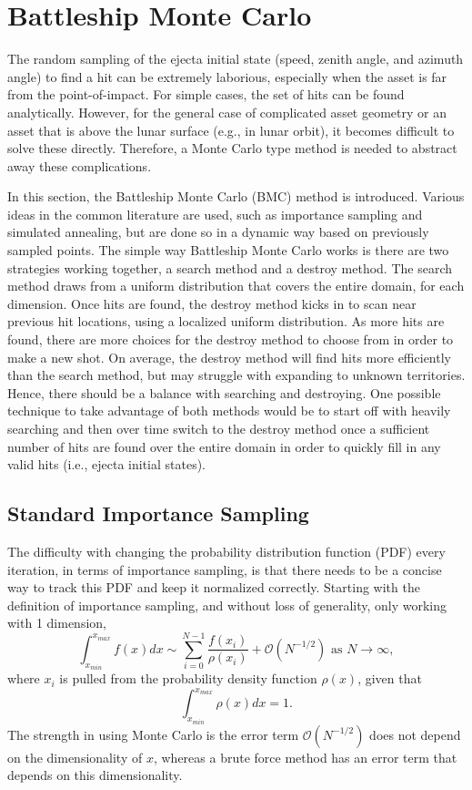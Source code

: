 \documentclass{article}
\begin{document}
\section{Battleship Monte Carlo}

The random sampling of the ejecta initial state (speed, zenith angle, and azimuth angle) to find a hit can be extremely laborious, especially when the asset is far from the point-of-impact. For simple cases, the set of hits can be found analytically. However, for the general case of complicated asset geometry or an asset that is above the lunar surface (e.g., in lunar orbit), it becomes difficult to solve these directly. Therefore, a Monte Carlo type method is needed to abstract away these complications.

In this section, the Battleship Monte Carlo (BMC) method is introduced. Various ideas in the common literature are used, such as importance sampling and simulated annealing, but are done so in a dynamic way based on previously sampled points. The simple way Battleship Monte Carlo works is there are two strategies working together, a search method and a destroy method. The search method draws from a uniform distribution that covers the entire domain, for each dimension. Once hits are found, the destroy method kicks in to scan near previous hit locations, using a localized uniform distribution. As more hits are found, there are more choices for the destroy method to choose from in order to make a new shot. On average, the destroy method will find hits more efficiently than the search method, but may struggle with expanding to unknown territories. Hence, there should be a balance with searching and destroying. One possible technique to take advantage of both methods would be to start off with heavily searching and then over time switch to the destroy method once a sufficient number of hits are found over the entire domain in order to quickly fill in any valid hits (i.e., ejecta initial states).

\subsection{Standard Importance Sampling}

The difficulty with changing the probability distribution function (PDF) every iteration, in terms of importance sampling, is that there needs to be a concise way to track this PDF and keep it normalized correctly. Starting with the definition of importance sampling, and without loss of generality, only working with 1 dimension,
\begin{equation}
\int_{x_{min}}^{x_{max}}f(x)dx \sim \sum_{i=0}^{N-1}\frac{f(x_i)}{\rho(x_i)} + \mathcal{O}(N^{-1/2}) \text{ as $N\to\infty$},
\end{equation}
where $x_i$ is pulled from the probability density function $\rho(x)$, given that
\begin{equation}
\int_{x_{min}}^{x_{max}}\rho(x)dx = 1.
\end{equation}
The strength in using Monte Carlo is the error term $\mathcal{O}(N^{-1/2})$ does not depend on the dimensionality of $x$, whereas a brute force method has an error term that depends on this dimensionality.
\end{document}
